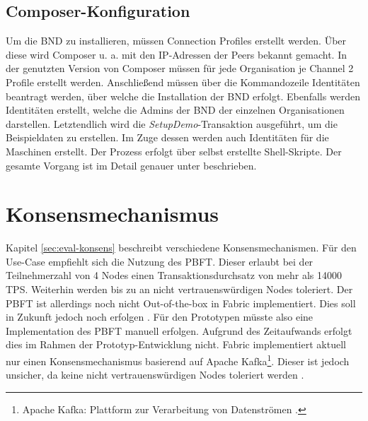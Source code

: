 \subsection{Composer-Konfiguration}
Um die \acs{BND} zu installieren, müssen Connection Profiles erstellt werden. Über diese wird Composer u. a. mit den IP-Adressen der Peers bekannt gemacht. In der genutzten Version von Composer müssen für jede Organisation je Channel 2 Profile erstellt werden. Anschließend müssen über die Kommandozeile Identitäten beantragt werden, über welche die Installation der \acs{BND} erfolgt. Ebenfalls werden Identitäten erstellt, welche die Admins der \acs{BND} der einzelnen Organisationen darstellen. Letztendlich wird die \textit{SetupDemo}-Transaktion ausgeführt, um die Beispieldaten zu erstellen. Im Zuge dessen werden auch Identitäten für die Maschinen erstellt. Der Prozess erfolgt über selbst erstellte Shell-Skripte. Der gesamte Vorgang ist im Detail genauer unter \cite{HyperledgerComposerTeamMultiOrgDeployment} beschrieben.

\section{Konsensmechanismus}
\label{sec:consensus-choose}
Kapitel \ref{sec:eval-konsens} beschreibt verschiedene Konsensmechanismen. Für den Use-Case empfiehlt sich die Nutzung des \acs{PBFT}. Dieser erlaubt bei der Teilnehmerzahl von 4 Nodes einen Transaktionsdurchsatz von mehr als 14000 \acs{TPS}. Weiterhin werden bis zu  an nicht vertrauenswürdigen Nodes toleriert. Der \acs{PBFT} ist allerdings noch nicht Out-of-the-box in Fabric implementiert. Dies soll in Zukunft jedoch noch erfolgen \cite{HyperledgerFabricTeamPluggableConsensusImplementations}. Für den Prototypen müsste also eine Implementation des \acs{PBFT} manuell erfolgen. Aufgrund des Zeitaufwands erfolgt dies im Rahmen der Prototyp-Entwicklung nicht. Fabric implementiert aktuell nur einen Konsensmechanismus basierend auf Apache Kafka\footnote{Apache Kafka: Plattform zur Verarbeitung von Datenströmen \cite{ApacheIntroductionApacheKafka}.}. Dieser ist jedoch unsicher, da keine nicht vertrauenswürdigen Nodes toleriert werden \cite{CachinBlockchainConsensusProtocols2017}.

